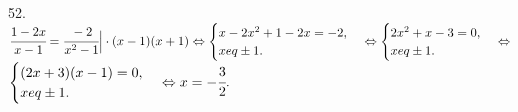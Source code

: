 52. $\cfrac{1-2x}{x-1}=\cfrac{-2}{x^2-1}\Big|\cdot(x-1)(x+1)\Leftrightarrow\begin{cases}x-2x^2+1-2x=-2,\\x
eq\pm1.\end{cases}
\Leftrightarrow\begin{cases}2x^2+x-3=0,\\x
eq\pm1.\end{cases}\Leftrightarrow$\\$\begin{cases}(2x+3)(x-1)=0,\\x
eq\pm1.\end{cases}\Leftrightarrow x=-\cfrac{3}{2}.$\\
